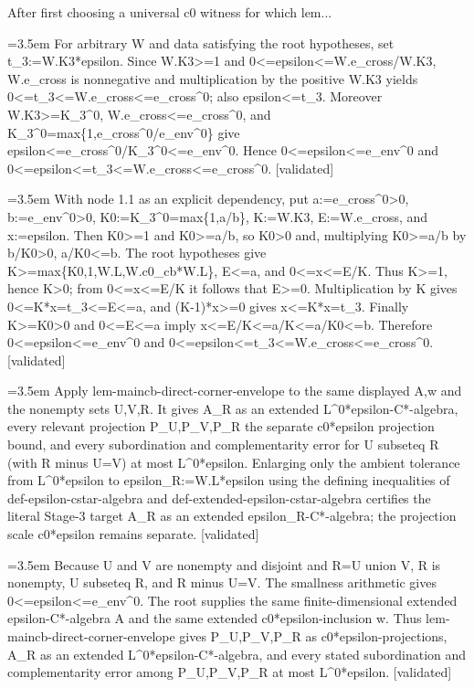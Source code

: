 \documentclass{article}
\newcommand{\step}[1]{\par\noindent\hangindent=3.5em\hangafter=1%
  \makebox[3.5em][l]{\textbf{#1.}}}
\newcommand{\steptag}[1]{\hfill{\small\textsf{[#1]}}}
\begin{document}
\begin{proofbox}{After first choosing a universal c0 witness for which lem...}
\step{1.2} For arbitrary W and data satisfying the root hypotheses, set t\_3:=W.K3*epsilon. Since W.K3>=1 and 0<=epsilon<=W.e\_cross/W.K3, W.e\_cross is nonnegative and multiplication by the positive W.K3 yields 0<=t\_3<=W.e\_cross<=e\_cross\textasciicircum{}0; also epsilon<=t\_3. Moreover W.K3>=K\_3\textasciicircum{}0, W.e\_cross<=e\_cross\textasciicircum{}0, and K\_3\textasciicircum{}0=max\{1,e\_cross\textasciicircum{}0/e\_env\textasciicircum{}0\} give epsilon<=e\_cross\textasciicircum{}0/K\_3\textasciicircum{}0<=e\_env\textasciicircum{}0. Hence 0<=epsilon<=e\_env\textasciicircum{}0 and 0<=epsilon<=t\_3<=W.e\_cross<=e\_cross\textasciicircum{}0. \steptag{validated} \\[6pt]
\step{1.2.1} With node 1.1 as an explicit dependency, put a:=e\_cross\textasciicircum{}0>0, b:=e\_env\textasciicircum{}0>0, K0:=K\_3\textasciicircum{}0=max\{1,a/b\}, K:=W.K3, E:=W.e\_cross, and x:=epsilon. Then K0>=1 and K0>=a/b, so K0>0 and, multiplying K0>=a/b by b/K0>0, a/K0<=b. The root hypotheses give K>=max\{K0,1,W.L,W.c0\_cb*W.L\}, E<=a, and 0<=x<=E/K. Thus K>=1, hence K>0; from 0<=x<=E/K it follows that E>=0. Multiplication by K gives 0<=K*x=t\_3<=E<=a, and (K-1)*x>=0 gives x<=K*x=t\_3. Finally K>=K0>0 and 0<=E<=a imply x<=E/K<=a/K<=a/K0<=b. Therefore 0<=epsilon<=e\_env\textasciicircum{}0 and 0<=epsilon<=t\_3<=W.e\_cross<=e\_cross\textasciicircum{}0. \steptag{validated} \\[4pt]
\step{1.3} Apply lem-maincb-direct-corner-envelope to the same displayed A,w and the nonempty sets U,V,R. It gives A\_R as an extended L\textasciicircum{}0*epsilon-C*-algebra, every relevant projection P\_U,P\_V,P\_R the separate c0*epsilon projection bound, and every subordination and complementarity error for U subseteq R (with R minus U=V) at most L\textasciicircum{}0*epsilon. Enlarging only the ambient tolerance from L\textasciicircum{}0*epsilon to epsilon\_R:=W.L*epsilon using the defining inequalities of def-epsilon-cstar-algebra and def-extended-epsilon-cstar-algebra certifies the literal Stage-3 target A\_R as an extended epsilon\_R-C*-algebra; the projection scale c0*epsilon remains separate. \steptag{validated} \\[6pt]
\step{1.3.1} Because U and V are nonempty and disjoint and R=U union V, R is nonempty, U subseteq R, and R minus U=V. The smallness arithmetic gives 0<=epsilon<=e\_env\textasciicircum{}0. The root supplies the same finite-dimensional extended epsilon-C*-algebra A and the same extended c0*epsilon-inclusion w. Thus lem-maincb-direct-corner-envelope gives P\_U,P\_V,P\_R as c0*epsilon-projections, A\_R as an extended L\textasciicircum{}0*epsilon-C*-algebra, and every stated subordination and complementarity error among P\_U,P\_V,P\_R at most L\textasciicircum{}0*epsilon. \steptag{validated} \\[6pt]

\end{proofbox}
\end{document}
